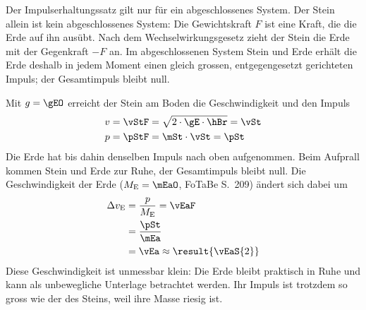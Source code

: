 \begin{center}
\end{center}

\begin{abcliste}
\abc Der Impulserhaltungssatz gilt nur für ein abgeschlossenes System. Der Stein allein ist kein abgeschlossenes System: Die Gewichtskraft $F$ ist eine Kraft, die die Erde auf ihn ausübt. Nach dem Wechselwirkungsgesetz zieht der Stein die Erde mit der Gegenkraft $-F$ an. Im abgeschlossenen System Stein und Erde erhält die Erde deshalb in jedem Moment einen gleich grossen, entgegengesetzt gerichteten Impuls; der Gesamtimpuls bleibt null.

\abc Mit $g = \gEO$ erreicht der Stein am Boden die Geschwindigkeit und den Impuls
\begin{align}
 v &= \vStF = \sqrt{2\cdot\gE\cdot\hBr} = \vSt \\
 p &= \pStF = \mSt\cdot\vSt = \pSt
\end{align}
Die Erde hat bis dahin denselben Impuls nach oben aufgenommen. Beim Aufprall kommen Stein und Erde zur Ruhe, der Gesamtimpuls bleibt null. Die Geschwindigkeit der Erde ($M_\text{E} = \mEaO$, FoTaBe S.~209) ändert sich dabei um
\begin{align}
 \Delta v_\text{E} &= \frac{p}{M_\text{E}} = \vEaF \\
   &= \frac{\pSt}{\mEa} \\
   &= \vEa \approx \result{\vEaS{2}}
\end{align}
Diese Geschwindigkeit ist unmessbar klein: Die Erde bleibt praktisch in Ruhe und kann als unbewegliche Unterlage betrachtet werden. Ihr Impuls ist trotzdem so gross wie der des Steins, weil ihre Masse riesig ist.
\end{abcliste}
